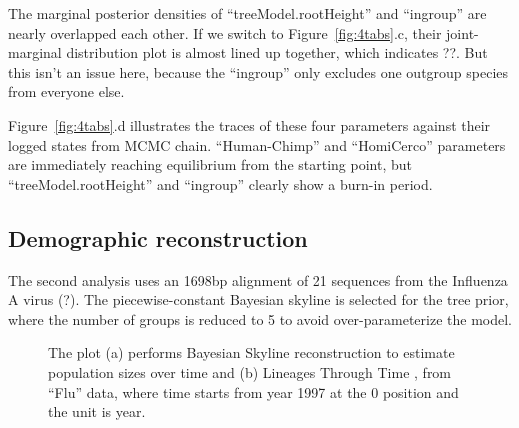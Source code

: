 \documentclass{bioinfo}
\begin{document}
The marginal posterior densities of ``treeModel.rootHeight'' and ``ingroup'' are nearly overlapped each other. If we switch to Figure~\ref{fig:4tabs}.c, their joint-marginal distribution plot is almost lined up together, which indicates ??. But this isn't an issue here, because the ``ingroup'' only excludes one outgroup species from everyone else. %

Figure~\ref{fig:4tabs}.d illustrates the traces of these four parameters against their logged states from MCMC chain. ``Human-Chimp'' and ``HomiCerco'' parameters are immediately reaching equilibrium from the starting point, but ``treeModel.rootHeight'' and ``ingroup'' clearly show a burn-in period. %

\subsection*{Demographic reconstruction}

The second analysis uses an 1698bp alignment of 21 sequences from the Influenza A virus (?). %
The piecewise-constant Bayesian skyline is selected for the tree prior, where the number of groups is reduced to 5 to avoid over-parameterize the model.



\begin{figure}[ht]
\caption{The plot (a) performs Bayesian Skyline reconstruction to estimate population sizes over time and (b) Lineages Through Time , from ``Flu'' data, where time starts from year 1997 at the 0 position and the unit is year.}
\label{fig:flu}
\end{figure}
\end{document}
